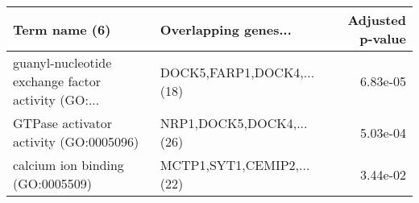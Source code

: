 \begin{tabular}{llr}
\toprule
                                     Term name (6) &      Overlapping genes... &  Adjusted p-value \\
\midrule
guanyl-nucleotide exchange factor activity (GO:... & DOCK5,FARP1,DOCK4,...(18) &          6.83e-05 \\
            GTPase activator activity (GO:0005096) &  NRP1,DOCK5,DOCK4,...(26) &          5.03e-04 \\
                  calcium ion binding (GO:0005509) & MCTP1,SYT1,CEMIP2,...(22) &          3.44e-02 \\
\bottomrule
\end{tabular}
